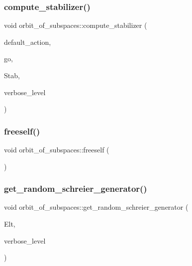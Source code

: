 \subsubsection{\texorpdfstring{compute\+\_\+stabilizer()}{compute\_stabilizer()}}
{\footnotesize\ttfamily void orbit\+\_\+of\+\_\+subspaces\+::compute\+\_\+stabilizer (\begin{DoxyParamCaption}\item[{\mbox{\hyperlink{classaction}{action}} $\ast$}]{default\+\_\+action,  }\item[{\mbox{\hyperlink{classlonginteger__object}{longinteger\+\_\+object}} \&}]{go,  }\item[{\mbox{\hyperlink{classsims}{sims}} $\ast$\&}]{Stab,  }\item[{\mbox{\hyperlink{galois_8h_a09fddde158a3a20bd2dcadb609de11dc}{I\+NT}}}]{verbose\+\_\+level }\end{DoxyParamCaption})}

\mbox{\label{classorbit__of__subspaces_a3157117462ce7ecbf8bf7eba61998f5a}} 
\subsubsection{\texorpdfstring{freeself()}{freeself()}}
{\footnotesize\ttfamily void orbit\+\_\+of\+\_\+subspaces\+::freeself (\begin{DoxyParamCaption}{ }\end{DoxyParamCaption})}

\mbox{\label{classorbit__of__subspaces_a3515f558abf49f6d5433709a9f83fd9f}} 
\subsubsection{\texorpdfstring{get\+\_\+random\+\_\+schreier\+\_\+generator()}{get\_random\_schreier\_generator()}}
{\footnotesize\ttfamily void orbit\+\_\+of\+\_\+subspaces\+::get\+\_\+random\+\_\+schreier\+\_\+generator (\begin{DoxyParamCaption}\item[{\mbox{\hyperlink{galois_8h_a09fddde158a3a20bd2dcadb609de11dc}{I\+NT}} $\ast$}]{Elt,  }\item[{\mbox{\hyperlink{galois_8h_a09fddde158a3a20bd2dcadb609de11dc}{I\+NT}}}]{verbose\+\_\+level }\end{DoxyParamCaption})}

